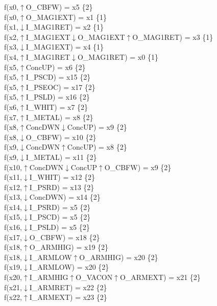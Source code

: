 f(x0,$\uparrow$O\_CBFW) = x5 \{2\} \\  
f(x0,$\uparrow$O\_MAG1EXT) = x1 \{1\} \\  
f(x1,$\downarrow$I\_MAG1RET) = x2 \{1\} \\  
f(x2,$\uparrow$I\_MAG1EXT$\downarrow$O\_MAG1EXT$\uparrow$O\_MAG1RET) = x3 \{1\} \\  
f(x3,$\downarrow$I\_MAG1EXT) = x4 \{1\} \\  
f(x4,$\uparrow$I\_MAG1RET$\downarrow$O\_MAG1RET) = x0 \{1\} \\  
f(x5,$\uparrow$ConcUP) = x6 \{2\} \\  
f(x5,$\uparrow$I\_PSCD) = x15 \{2\} \\  
f(x5,$\uparrow$I\_PSEOC) = x17 \{2\} \\  
f(x5,$\uparrow$I\_PSLD) = x16 \{2\} \\  
f(x6,$\uparrow$I\_WHIT) = x7 \{2\} \\  
f(x7,$\uparrow$I\_METAL) = x8 \{2\} \\  
f(x8,$\uparrow$ConcDWN$\downarrow$ConcUP) = x9 \{2\} \\  
f(x8,$\downarrow$O\_CBFW) = x10 \{2\} \\  
f(x9,$\downarrow$ConcDWN$\uparrow$ConcUP) = x8 \{2\} \\  
f(x9,$\downarrow$I\_METAL) = x11 \{2\} \\  
f(x10,$\uparrow$ConcDWN$\downarrow$ConcUP$\uparrow$O\_CBFW) = x9 \{2\} \\  
f(x11,$\downarrow$I\_WHIT) = x12 \{2\} \\  
f(x12,$\uparrow$I\_PSRD) = x13 \{2\} \\  
f(x13,$\downarrow$ConcDWN) = x14 \{2\} \\  
f(x14,$\downarrow$I\_PSRD) = x5 \{2\} \\  
f(x15,$\downarrow$I\_PSCD) = x5 \{2\} \\  
f(x16,$\downarrow$I\_PSLD) = x5 \{2\} \\  
f(x17,$\downarrow$O\_CBFW) = x18 \{2\} \\  
f(x18,$\uparrow$O\_ARMHIG) = x19 \{2\} \\  
f(x18,$\downarrow$I\_ARMLOW$\uparrow$O\_ARMHIG) = x20 \{2\} \\  
f(x19,$\downarrow$I\_ARMLOW) = x20 \{2\} \\  
f(x20,$\uparrow$I\_ARMHIG$\uparrow$O\_VACON$\uparrow$O\_ARMEXT) = x21 \{2\} \\  
f(x21,$\downarrow$I\_ARMRET) = x22 \{2\} \\  
f(x22,$\uparrow$I\_ARMEXT) = x23 \{2\} \\  
